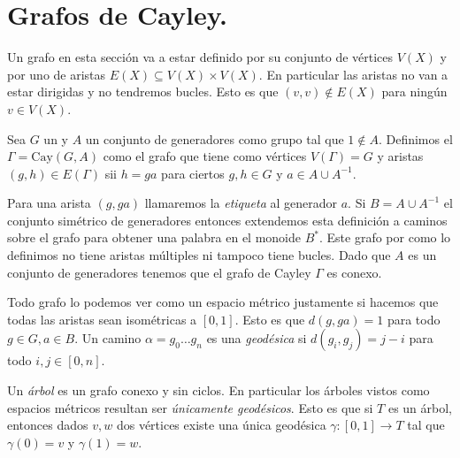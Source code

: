\documentclass[tesis.tex]{subfiles}
\begin{document}
	
\section{Grafos de Cayley.} \label{seccion_treewidth}

Un grafo en esta sección va a estar definido por su conjunto de vértices $V(X)$ y por uno de aristas $E(X) \subseteq V(X) \times V(X)$.
En particular las aristas no van a estar dirigidas y no tendremos bucles.
Esto es que $(v,v) \notin E(X)$ para ningún $v \in V(X)$.

\begin{deff}
	Sea $G$ un \fg y $A$ un conjunto de generadores como grupo tal que $1 \notin A$.
	Definimos el  $\Gamma = \text{Cay}(G,A)$ como el grafo que tiene como vértices $V(\Gamma) = G$ y aristas $(g,h) \in E(\Gamma)$ sii $h=ga$ para ciertos $g,h \in G$ y $a \in A \cup A^{-1}$. 
\end{deff}

Para una arista $(g,ga)$ llamaremos la \emph{etiqueta} al generador $a$.
Si $B = A \cup A^{-1}$ el conjunto simétrico de generadores entonces extendemos esta definición a caminos sobre el grafo para obtener una palabra en el monoide $B^*$.
Este grafo por como lo definimos no tiene aristas múltiples ni tampoco tiene bucles.
Dado que $A$ es un conjunto de generadores tenemos que el grafo de Cayley $\Gamma$ es conexo.

Todo grafo lo podemos ver como un espacio métrico justamente si hacemos que todas las aristas sean isométricas a $[0,1]$. 
Esto es que $d(g,ga) = 1$ para todo $g \in G, a \in B$. 
Un camino $\alpha = g_0 \dots g_n$ es una \emph{geodésica} si $d(g_i,g_j) = j-i$ para todo $i,j \in [0,n]$.


Un \emph{árbol} es un grafo conexo y sin ciclos. 
En particular los árboles vistos como espacios métricos resultan ser \emph{únicamente geodésicos}. 
Esto es que si $T$ es un árbol, entonces dados $v,w$ dos vértices existe una única geodésica $\gamma:[0,1] \to T$ tal que $\gamma(0)=v$ y $\gamma(1)=w$.

%	
%	
\end{document}
